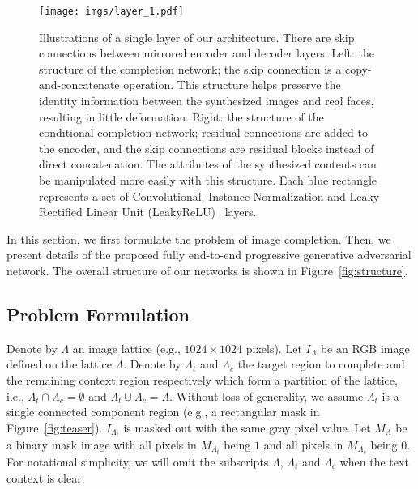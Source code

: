 \documentclass[acmtog,timestamp]{acmart}
\begin{document}
\begin{figure*}
      \centering
      \begin{minipage}{1.0\textwidth}
          \centering
          \texttt{[image: imgs/layer\_1.pdf]} %
      \end{minipage}\hfill
	 \caption{Illustrations of a single layer of our architecture. There are skip connections between mirrored encoder and decoder layers. Left: the structure of the completion network; the skip connection is a copy-and-concatenate operation. This structure helps preserve the identity information between the synthesized images and real faces, resulting in little deformation. Right: the structure of the conditional completion network; residual connections are added to the encoder, and the skip connections are residual blocks instead of direct concatenation. The attributes of the synthesized contents can be manipulated more easily with this structure. Each blue rectangle represents a set of Convolutional, Instance Normalization and Leaky Rectified Linear Unit (LeakyReLU)~\cite{maas2013rectifier} layers.}
     \label{fig:layer}
\end{figure*}%
In this section, we first formulate the problem of image completion. Then, we present details of the proposed fully end-to-end progressive generative adversarial network. The overall structure of our networks is shown in Figure~\ref{fig:structure}.

\subsection{Problem Formulation}
Denote by $\Lambda$ an image lattice (e.g., $1024\times 1024$ pixels). Let $I_{\Lambda}$ be an RGB image defined on the lattice $\Lambda$. Denote by $\Lambda_t$ and $\Lambda_c$ the target region to complete and the remaining context region respectively which form a partition of the lattice, i.e., $\Lambda_t\cap\Lambda_c=\emptyset$ and $\Lambda_t\cup\Lambda_c=\Lambda$. Without loss of generality, we assume $\Lambda_t$ is a single connected component region (e.g., a rectangular mask in Figure~\ref{fig:teaser}). $I_{\Lambda_t}$ is masked out with the same gray pixel value. Let $M_{\Lambda}$ be a binary mask image with all pixels in  $M_{\Lambda_t}$ being $1$ and all pixels in  $M_{\Lambda_c}$ being $0$. For notational simplicity, we will omit the subscripts $\Lambda$, $\Lambda_t$ and $\Lambda_c$ when the text context is clear. 
\end{document}
